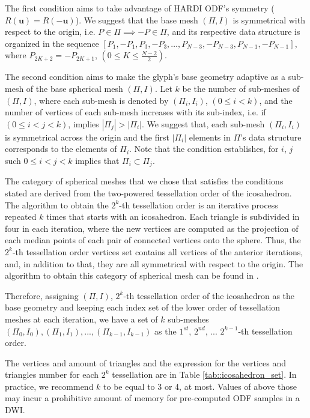 \documentclass[twoside,twocolumn,10pt]{article}
\begin{document}
The first condition aims to take advantage of HARDI ODF's symmetry ($R(\bm{u}) = R(-\bm{u})$). We suggest that the base mesh $(\Pi, I)$ is symmetrical with respect to the origin, i.e. $P \in \Pi \implies -P \in \Pi$, and its respective data structure is organized in the sequence $[P_1, -P_1, P_3, -P_3, \dots, P_{N-3}, -P_{N-3}, P_{N-1}, -P_{N-1}]$, where $P_{2K+2} = -P_{2K+1}$, $(0 \leq K \leq \frac{N-2}{2})$.

The second condition aims to make the glyph's base geometry adaptive as a sub-mesh of the base spherical mesh $(\Pi, I)$. Let $k$ be the number of sub-meshes of $(\Pi, I)$, where each sub-mesh is denoted by $(\Pi_i, I_i)$,  $(0 \leq i < k)$, and the number of vertices of each sub-mesh increases with its sub-index, i.e. if  $(0 \leq i < j < k)$, implies $|\Pi_j| > |\Pi_i|$. We suggest that, each sub-mesh $(\Pi_i, I_i)$ is symmetrical across the origin and the first $|\Pi_i|$ elements in  $\Pi$'s data structure corresponds to the elements of $\Pi_i$. Note that the condition establishes, for $i$, $j$ such $0 \leq i < j < k$ implies that $\Pi_i \subset \Pi_j$.

The category of spherical meshes that we chose that satisfies the conditions stated are derived from the two-powered tessellation order of the icosahedron. The algorithm to obtain the $2^k$-th tessellation order is an iterative process repeated $k$ times that starts with an icosahedron. Each triangle is subdivided in four in each iteration, where the new vertices are computed as the projection of each median points of each pair of connected vertices onto the sphere. Thus, the $2^k$-th tessellation order vertices set contains all vertices of the anterior iterations, and, in addition to that, they are all symmetrical with respect to the origin. The algorithm to obtain this category of spherical mesh can be found in \cite{luna2012}.

Therefore, assigning $(\Pi, I)$, $2^{k}$-th tessellation order of the icosahedron as the base geometry and keeping each index set of the lower order of tessellation meshes at each iteration, we have a set of $k$ sub-meshes $(\Pi_0, I_0), (\Pi_1, I_1), ..., (\Pi_{k-1}, I_{k-1})$ as the $1^{st}$, $2^{nd}$, ... $2^{k-1}$-th tessellation order.




The vertices and amount of triangles and the expression for the vertices and triangles number for each $2^k$ tessellation are in Table \ref{tab::icosahedron_set}. In practice, we recommend $k$ to be equal to 3 or 4, at most. Values of above those may incur a prohibitive amount of memory for pre-computed ODF samples in a DWI.
\end{document}
